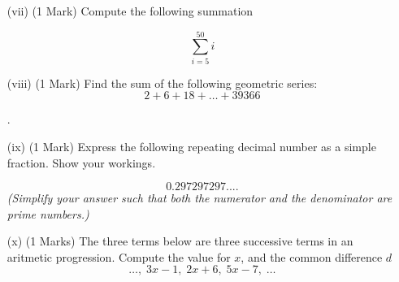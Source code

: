 \documentclass[11pt]{article} %
\begin{document}
\begin{enumerate} %
	\item[(vii)](1 Mark) Compute the following summation
	
	\[ \sum_{i=5}^{50} i \]

	\vspace{5.5cm}
	\item[(viii)] (1 Mark) Find the sum of the following geometric series: 
		\[2 + 6 + 18 +  \ldots + 39366		\]



\newpage
.
\newpage	
	\item[(ix)] (1 Mark) Express the following repeating decimal number as a simple fraction. Show your workings.
	
	\[0.297297297....\]
\textit{(Simplify your answer such that both the numerator and the denominator are prime numbers.)}
	\vspace{5.5cm}

	\item[(x)] (1 Marks) The three terms below are three successive terms in an aritmetic progression. Compute the value for $x$, and the common difference $d$
		\[ \ldots,\; 3x-1,\; 2x+6,\;	5x-7,\; \ldots		  \]
		
\end{enumerate}
\end{document}
